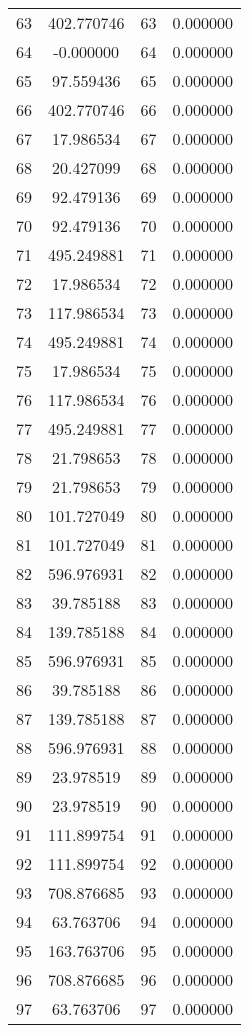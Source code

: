 \documentclass[12pt]{article}
\begin{document}
\begin{longtable}{@{}cccc@{}}
63 & 402.770746 & 63 & 0.000000 \\
64 & -0.000000 & 64 & 0.000000 \\
65 & 97.559436 & 65 & 0.000000 \\
66 & 402.770746 & 66 & 0.000000 \\
67 & 17.986534 & 67 & 0.000000 \\
68 & 20.427099 & 68 & 0.000000 \\
69 & 92.479136 & 69 & 0.000000 \\
70 & 92.479136 & 70 & 0.000000 \\
71 & 495.249881 & 71 & 0.000000 \\
72 & 17.986534 & 72 & 0.000000 \\
73 & 117.986534 & 73 & 0.000000 \\
74 & 495.249881 & 74 & 0.000000 \\
75 & 17.986534 & 75 & 0.000000 \\
76 & 117.986534 & 76 & 0.000000 \\
77 & 495.249881 & 77 & 0.000000 \\
78 & 21.798653 & 78 & 0.000000 \\
79 & 21.798653 & 79 & 0.000000 \\
80 & 101.727049 & 80 & 0.000000 \\
81 & 101.727049 & 81 & 0.000000 \\
82 & 596.976931 & 82 & 0.000000 \\
83 & 39.785188 & 83 & 0.000000 \\
84 & 139.785188 & 84 & 0.000000 \\
85 & 596.976931 & 85 & 0.000000 \\
86 & 39.785188 & 86 & 0.000000 \\
87 & 139.785188 & 87 & 0.000000 \\
88 & 596.976931 & 88 & 0.000000 \\
89 & 23.978519 & 89 & 0.000000 \\
90 & 23.978519 & 90 & 0.000000 \\
91 & 111.899754 & 91 & 0.000000 \\
92 & 111.899754 & 92 & 0.000000 \\
93 & 708.876685 & 93 & 0.000000 \\
94 & 63.763706 & 94 & 0.000000 \\
95 & 163.763706 & 95 & 0.000000 \\
96 & 708.876685 & 96 & 0.000000 \\
97 & 63.763706 & 97 & 0.000000 \\

\end{longtable}
\end{document}
